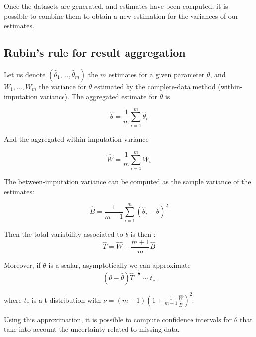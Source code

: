 Once the datasets are generated, and estimates have been computed, it is possible to combine them to obtain a new estimation for the variances of our estimates\cite[Ch.\ 5]{Rubin_missdata}.

		\subsection{Rubin's rule for result aggregation}

Let us denote $(\hat{\theta}_1, \ldots, \hat{\theta}_m)$ the $m$ estimates for a given parameter $\theta$, and $W_1, \ldots, W_m$ the variance for $\theta$ estimated by the complete-data method (within-imputation variance). The aggregated estimate for $\theta$ is

$$\hat{\theta} = \frac{1}{m} \sum\limits_{i=1}^m \hat{\theta}_i $$

And the aggregated within-imputation variance 

$$ \hat{W} = \frac{1}{m} \sum\limits_{i=1}^m W_i $$

The between-imputation variance can be computed as the sample variance of the estimates:

$$\hat{B} = \frac{1}{m-1} \sum\limits_{i=1}^m (\hat{\theta}_i - \hat{\theta})^2$$

Then the total variability associated to $\theta$ is then \cite[Ch.\ 5]{Rubin_missdata}:
$$\hat{T} = \hat{W} + \frac{m+1}{m} \hat{B}$$

Moreover, if $\theta$ is a scalar, asymptotically we can approximate \cite{rubin1986mi_founding}
$$ (\theta - \hat{\theta})\hat{T}^{-\frac{1}{2}} \sim t_\nu$$

where $t_\nu$ is a t-distribution with $\nu = (m-1)(1+\frac{1}{m+1}\frac{\hat{W}}{\hat{B}})^2$. 

Using this approximation, it is possible to compute confidence intervals for $\theta$ that take into account the uncertainty related to missing data.